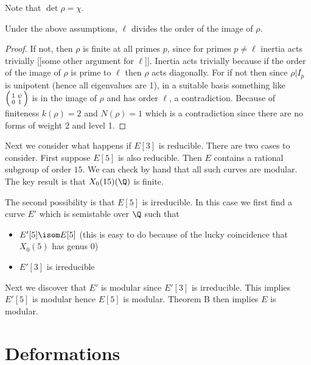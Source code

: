\documentclass{report}
\begin{document}
Note that $\det\rho=\chi$.
\begin{lemma} Under the above assumptions, $\ell$ divides the order
of the image of $\rho$. \end{lemma}
\begin{proof}
If not, then $\rho$ is finite at all primes $p$, since for primes $p\neq\ell$
inertia acts trivially [[some other argument
for $\ell$]]. Inertia acts trivially because if the order
of the image of $\rho$ is prime to $\ell$ then $\rho$ acts
diagonally. For if not then since $\rho|I_p$ is unipotent
(hence all eigenvalues are 1), in a suitable basis
something like $\Bigl(\begin{smallmatrix}1&\psi\\0&1\end{smallmatrix}\Bigr)$
is in the image of $\rho$ and has order $\ell$, a contradiction.
Because of finiteness $k(\rho)=2$ and $N(\rho)=1$ which is a contradiction
since there are no forms of weight 2 and level 1.
\end{proof}

Next we consider what happens if $E[3]$ is reducible. There are two
cases to consider. First suppose $E[5]$ is also reducible. Then
$E$ contains a rational subgroup of order $15$. We can check by hand
that all such curves are modular. The key result is that
$X_0(15)(\Q)$ is finite.

The second possibility is that $E[5]$ is irreducible. In this case
we first find a curve $E'$ which is semistable over $\Q$ such
that
\begin{itemize}
\item $E'[5]\isom E[5]$ (this is easy to do because of the lucky
       coincidence that $X_0(5)$ has genus $0$)
\item $E'[3]$ is irreducible
\end{itemize}
Next we discover that $E'$ is modular since $E'[3]$ is irreducible.
This implies $E'[5]$ is modular hence $E[5]$ is modular. Theorem
B then implies $E$ is modular.

\chapter{Deformations}
\end{document}

